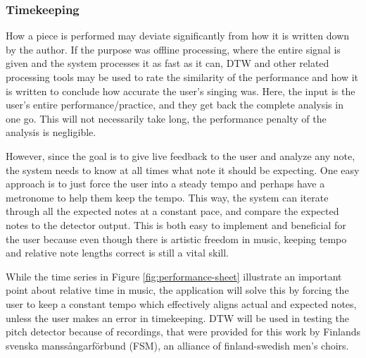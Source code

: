 \subsubsection{Timekeeping}
How a piece is performed may deviate significantly from how it is written down by the author. If the purpose was offline processing, where the entire signal is given and the system processes it as fast as it can, DTW and other related processing tools may be used to rate the similarity of the performance and how it is written to conclude how accurate the user's singing was. Here, the input is the user's entire performance/practice, and they get back the complete analysis in one go. This will not necessarily take long, the performance penalty of the analysis is negligible.

However, since the goal is to give live feedback to the user and analyze any note, the system needs to know at all times what note it should be expecting. One easy approach is to just force the user into a steady tempo and perhaps have a metronome to help them keep the tempo. This way, the system can iterate through all the expected notes at a constant pace, and compare the expected notes to the detector output. This is both easy to implement and beneficial for the user because even though there is artistic freedom in music, keeping tempo and relative note lengths correct is still a vital skill. 

While the time series in Figure \ref{fig:performance-sheet} illustrate an important point about relative time in music, the application will solve this by forcing the user to keep a constant tempo which effectively aligns actual and expected notes, unless the user makes an error in timekeeping. DTW will be used in testing the pitch detector because of recordings, that were provided for this work by Finlands svenska manssångarförbund (FSM), an alliance of finland-swedish men's choirs. 
